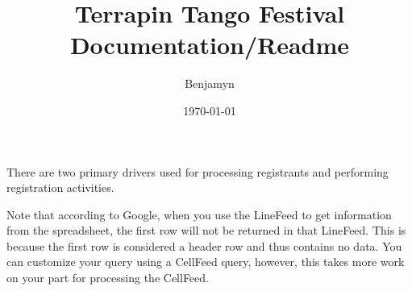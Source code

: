 \documentclass[12pt,final]{article}
\author{\vspace{-20pt}Benjamyn}
\date{\today}
\title{\vspace{-40pt}Terrapin Tango Festival Documentation/Readme}
\begin{document}
\maketitle
\tableofcontents

There are two primary drivers used for processing registrants and 
performing registration activities. 
\benum
\eenum



Note that according to Google, when you use the LineFeed to get information
from the spreadsheet, the first row will not be returned in that LineFeed.
This is because the first row is considered a header row and thus
contains no data. You can customize your query using a CellFeed query,
however, this takes more work on your part for processing the CellFeed.
\end{document}
